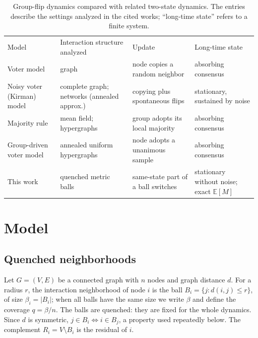 \documentclass[aps,pre,reprint,superscriptaddress,amsmath,amssymb,longbibliography]{revtex4-2}
\theoremstyle{remark}
\newcommand{\E}{\mathbb{E}}
\begin{document}
\begin{table}[t]
\caption{Group-flip dynamics compared with related two-state dynamics.
The entries describe the settings analyzed in the cited works; ``long-time
state'' refers to a finite system.}
\label{tab:compare}
\begin{ruledtabular}
\begin{tabular}{p{3.2cm}p{4.1cm}p{4.1cm}p{4.1cm}}
Model & Interaction structure analyzed & Update & Long-time state\\
\colrule
Voter model~\cite{CliffordSudbury1973,HolleyLiggett1975} & graph & node copies a random neighbor & absorbing consensus\\
Noisy voter (Kirman) model~\cite{Kirman1993,GranovskyMadras1995,Carro2016} & complete graph; networks (annealed approx.) & copying plus spontaneous flips & stationary, sustained by noise\\
Majority rule~\cite{Krapivsky2003,Noonan2021} & mean field; hypergraphs & group adopts its local majority & absorbing consensus\\
Group-driven voter model~\cite{Kim2025} & annealed uniform hypergraphs & node adopts a unanimous sample & absorbing consensus\\
This work & quenched metric balls & same-state part of a ball switches & stationary without noise; exact $\E[M]$\\
\end{tabular}
\end{ruledtabular}
\end{table}

\section{Model}
\label{sec:model}

\subsection{Quenched neighborhoods}

Let $G=(V,E)$ be a connected graph with $n$ nodes and graph distance
$d$. For a radius $r$, the interaction neighborhood of node $i$ is the
ball $B_i=\{j:d(i,j)\le r\}$, of size $\beta_i=|B_i|$; when all balls
have the same size we write $\beta$ and define the coverage
$q=\beta/n$. The balls are quenched: they are fixed for the whole
dynamics. Since $d$ is symmetric, $j\in B_i\iff i\in B_j$, a property
used repeatedly below. The complement $R_i=V\setminus B_i$ is the
residual of $i$.
\end{document}
